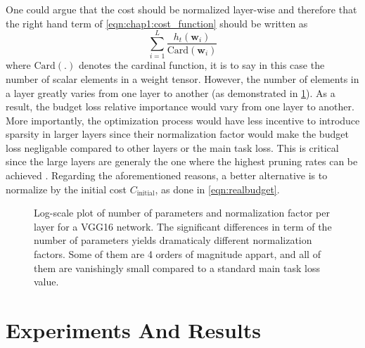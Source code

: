 One could argue that the cost should be normalized layer-wise and therefore that
the right hand term of \cref{eqn:chap1:cost_function} should be written as
$$\displaystyle\sum_{i=1}^{L}\frac{h_t(\mathbf{w}_i)}{\text{Card}(\mathbf{w}_i)}$$
where $\text{Card}(.)$ denotes the cardinal function, it is to say in this case
the number of scalar elements in a weight tensor. However, the number of
elements in a layer greatly varies from one layer to another (as demonstrated in
\cref{fig:chap1:vgg16_per_layer_param_and_norm_factor}). As a result,  the
budget loss relative importance would vary from one layer to another. More
importantly, the optimization process would have less incentive to introduce
sparsity in larger layers since their normalization factor would make the budget
loss negligable compared to other layers or the main task loss. This is critical
since the large layers are generaly the one where the highest pruning rates can
be achieved \cite{DBLP:journals/corr/abs-2202-12002}. Regarding the
aforementioned reasons, a better alternative is to normalize by the initial cost
$C_\text{initial}$, as done in \cref{eqn:realbudget}.\\



\begin{figure}
  \centering
    \caption{\centering Log-scale plot of
      number of parameters and normalization factor per layer for a VGG16
      network. The significant differences in term of the number of parameters
      yields dramaticaly different normalization factors. Some of them are 4
      orders of magnitude appart, and all of them are vanishingly small compared
      to a standard main task loss value.} 
  \label{fig:chap1:vgg16_per_layer_param_and_norm_factor}
\end{figure}

\section{Experiments And Results}
\label{sec:chap1:experiments}